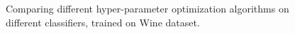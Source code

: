 \documentclass[twoside,11pt]{article}
\begin{document}
\begin{figure}
    \qquad
    \qquad
    \caption{Comparing different hyper-parameter optimization algorithms on different classifiers, trained on Wine dataset.}%
    \label{fig:wine}%
\end{figure}

\begin{figure}%
    \centering
    \qquad
    \qquad
    \qquad

\end{figure}
\end{document}
